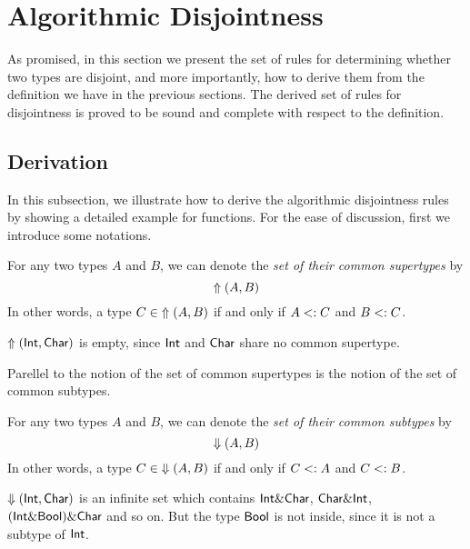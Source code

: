 \section{Algorithmic Disjointness} \label{sec:alg-dis}

As promised, in this section we present the set of rules for determining whether
two types are disjoint, and more importantly, how to derive them from the
definition we have in the previous sections. The derived set of rules for
disjointness is proved to be sound and complete with respect to the definition.

\subsection{Derivation}

In this subsection, we illustrate how to derive the algorithmic disjointness
rules by showing a detailed example for functions. For the ease of discussion,
first we introduce some notations.

\begin{definition}
  For any two types $A$ and $B$, we can denote the \emph{set of their common
  supertypes} by \[ \Uparrow(A,B) \] In other words, a type $C \in \;
  \Uparrow(A,B)$ if and only  if $A <: C$ and $B <: C$.
\end{definition}

\begin{example}
  $\Uparrow(\textsf{Int},\textsf{Char})$ is empty, since $\textsf{Int}$ and $\textsf{Char}$
  share no common supertype.
\end{example}

Parellel to the notion of the set of common supertypes is the notion of the set
of common subtypes.

\begin{definition}
  For any two types $A$ and $B$, we can denote the \emph{set of their common
  subtypes} by \[ \Downarrow(A,B) \] In other words, a type $C \in \; \Downarrow(A,B)$
  if and only  if $C <: A$ and $C <: B$.
\end{definition}

\begin{example}
  $\Downarrow(\textsf{Int},\textsf{Char})$ is an infinite set which contains $\textsf{Int} \&
  \textsf{Char}$, $\textsf{Char} \& \textsf{Int}$, $(\textsf{Int} \& \textsf{Bool}) \& \textsf{Char}$
  and so on. But the type $\textsf{Bool}$ is not inside, since it is not a subtype of
  $\textsf{Int}$.
\end{example}

